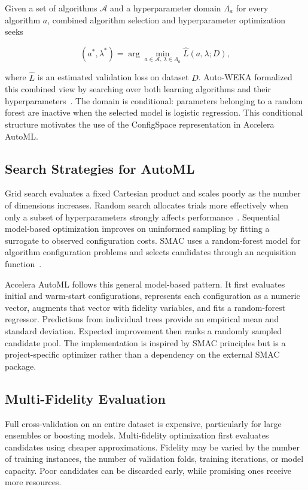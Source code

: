 \documentclass[12pt,a4paper]{report}
\begin{document}
Given a set of algorithms $\mathcal{A}$ and a hyperparameter domain
$\Lambda_a$ for every algorithm $a$, combined algorithm selection and
hyperparameter optimization seeks

\begin{equation}
  (a^*, \lambda^*) =
  \arg\min_{a \in \mathcal{A},\,\lambda \in \Lambda_a}
  \widehat{L}(a, \lambda; D),
\end{equation}

\noindent where $\widehat{L}$ is an estimated validation loss on dataset $D$.
Auto-WEKA formalized this combined view by searching over both learning
algorithms and their hyperparameters~\cite{autoweka}. The domain is
conditional: parameters belonging to a random forest are inactive when the
selected model is logistic regression. This conditional structure motivates the
use of the ConfigSpace representation in Accelera AutoML.

\subsection{Search Strategies for AutoML}
Grid search evaluates a fixed Cartesian product and scales poorly as the number
of dimensions increases. Random search allocates trials more effectively when
only a subset of hyperparameters strongly affects performance~\cite{randomsearch}.
Sequential model-based optimization improves on uninformed sampling by fitting a
surrogate to observed configuration costs. SMAC uses a random-forest model for
algorithm configuration problems and selects candidates through an acquisition
function~\cite{smac}.

\medskip
\noindent Accelera AutoML follows this general model-based pattern. It first
evaluates initial and warm-start configurations, represents each configuration
as a numeric vector, augments that vector with fidelity variables, and fits a
random-forest regressor. Predictions from individual trees provide an empirical
mean and standard deviation. Expected improvement then ranks a randomly sampled
candidate pool. The implementation is inspired by SMAC principles but is a
project-specific optimizer rather than a dependency on the external SMAC
package.

\subsection{Multi-Fidelity Evaluation}
Full cross-validation on an entire dataset is expensive, particularly for large
ensembles or boosting models. Multi-fidelity optimization first evaluates
candidates using cheaper approximations. Fidelity may be varied by the number of
training instances, the number of validation folds, training iterations, or
model capacity. Poor candidates can be discarded early, while promising ones
receive more resources.
\end{document}
